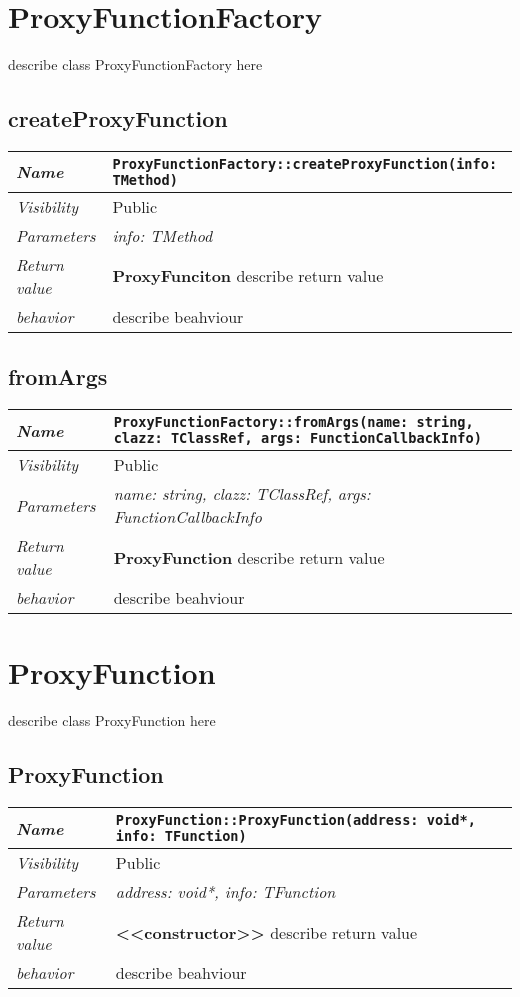  \chapter{ProxyFunctionFactory}
describe class ProxyFunctionFactory here
\section{createProxyFunction}
\begin{longtable}{p{3cm} @{\hskip 1cm} p{12cm}}
 \hline
\textit{Name} & \texttt{ProxyFunctionFactory::createProxyFunction(info: TMethod)}\\
\hline
 \textit{Visibility} & Public \\
\hline
\textit{Parameters} & \textit{info: TMethod}\\
\hline
\textit{Return value} & \textbf{ ProxyFunciton} describe return value\\
  \hline
 \textit{behavior} & describe beahviour \\
\hline
\end{longtable} \pagebreak
 \section{fromArgs}
\begin{longtable}{p{3cm} @{\hskip 1cm} p{12cm}}
 \hline
\textit{Name} & \texttt{ProxyFunctionFactory::fromArgs(name: string, clazz: TClassRef, args: FunctionCallbackInfo)}\\
\hline
 \textit{Visibility} & Public \\
\hline
\textit{Parameters} & \textit{name: string, clazz: TClassRef, args: FunctionCallbackInfo}\\
\hline
\textit{Return value} & \textbf{ ProxyFunction} describe return value\\
  \hline
 \textit{behavior} & describe beahviour \\
\hline
\end{longtable} \pagebreak
 \chapter{ProxyFunction}
describe class ProxyFunction here
\section{ProxyFunction}
\begin{longtable}{p{3cm} @{\hskip 1cm} p{12cm}}
 \hline
\textit{Name} & \texttt{ProxyFunction::ProxyFunction(address: void*, info: TFunction)}\\
\hline
 \textit{Visibility} & Public \\
\hline
\textit{Parameters} & \textit{address: void*, info: TFunction}\\
\hline
\textit{Return value} & \textbf{ <<constructor>>} describe return value\\
  \hline
 \textit{behavior} & describe beahviour \\
\hline
\end{longtable} \pagebreak
